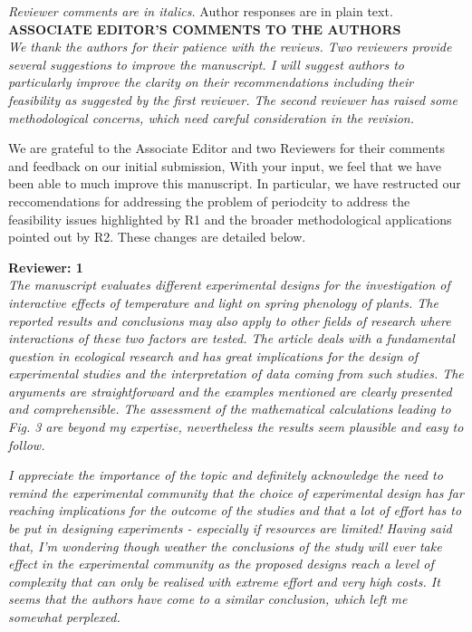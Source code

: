 \documentclass[11pt]{article}
\begin{document}
\emph{Reviewer comments are in italics.} Author responses are in plain text.\\


\textbf{ASSOCIATE EDITOR'S COMMENTS TO THE AUTHORS}\\
\emph{We thank the authors for their patience with the reviews. Two reviewers provide several suggestions to improve the manuscript. I will suggest authors to particularly improve the clarity on their recommendations including their feasibility as suggested by the first reviewer. The second reviewer has raised some methodological concerns, which need careful consideration in the revision.}

We are grateful to the Associate Editor and two Reviewers for their comments and feedback on our initial submission, With your input, we feel that we have been able to much improve this manuscript. In particular, we have restructed our reccomendations for addressing the problem of periodcity to address the feasibility issues highlighted by R1 and the broader methodological applications pointed out by R2. These changes are detailed below.

\textbf{Reviewer: 1}\\
\emph{The manuscript evaluates different experimental designs for the investigation of interactive effects of temperature and light on spring phenology of plants. The reported results and conclusions may also apply to other fields of research where interactions of these two factors are tested. The article deals with a fundamental question in ecological research and has great implications for the design of experimental studies and the interpretation of data coming from such studies. The arguments are straightforward and the examples mentioned are clearly presented and comprehensible. The assessment of the mathematical calculations leading to Fig. 3 are beyond my expertise, nevertheless the results seem plausible and easy to follow.}

\emph{I appreciate the importance of the topic and definitely acknowledge the need to remind the experimental community that the choice of experimental design has far reaching implications for the outcome of the studies and that a lot of effort has to be put in designing experiments - especially if resources are limited! Having said that, I’m wondering though weather the conclusions of the study will ever take effect in the experimental community as the proposed designs reach a level of complexity that can only be realised with extreme effort and very high costs. It seems that the authors have come to a similar conclusion, which left me somewhat perplexed.}
\end{document}

